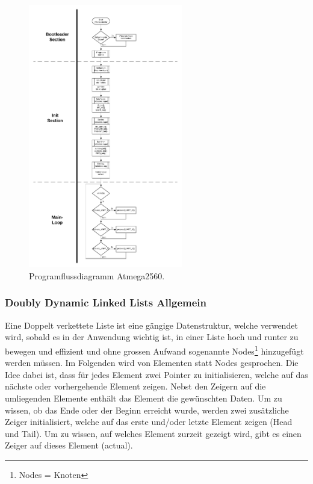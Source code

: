 \begin{figure}[h!]
	\centering
	\includegraphics[width=0.6\textwidth]{graphics/Programmfluss_Atmega2560.pdf}
	\caption{Programflussdiagramm Atmega2560.}
	\label{fig:Programmfluss_Atmega2560}
\end{figure}
\newpage


\subsubsection{Doubly Dynamic Linked Lists Allgemein}\label{subsubsec:Dynamic_Linked_Lists}

Eine Doppelt verkettete Liste ist eine gängige Datenstruktur, welche verwendet wird, sobald es in der Anwendung wichtig ist, in einer Liste hoch und runter zu bewegen und effizient und ohne grossen Aufwand sogenannte Nodes\footnote{Nodes = Knoten} hinzugefügt werden müssen. Im Folgenden wird von Elementen statt Nodes gesprochen. Die Idee dabei ist, dass für jedes Element zwei Pointer zu initialisieren, welche auf das nächste oder vorhergehende Element zeigen. Nebst den Zeigern auf die umliegenden Elemente enthält das Element die gewünschten Daten. Um zu wissen, ob das Ende oder der Beginn erreicht wurde, werden zwei zusätzliche Zeiger initialisiert, welche auf das erste und/oder letzte Element zeigen (Head und Tail). Um zu wissen, auf welches Element zurzeit gezeigt wird, gibt es einen Zeiger auf dieses Element (actual).

